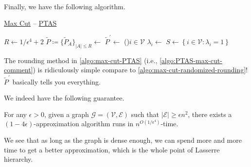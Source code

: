 Finally, we have the following algorithm.

\begin{algorithm}[H]\label{algo:max-cut-PTAS}
	\DontPrintSemicolon
	\caption{\hyperref[prb:max-cut]{Max Cut} -- \href{https://en.wikipedia.org/wiki/Polynomial-time_approximation_scheme}{PTAS}}
	\BlankLine
	\(R\gets 1 / \epsilon ^4 + 2\)\;
	\(\widetilde{P} \coloneqq \{ \widetilde{P} _A \}_{\left\vert A \right\vert \leq R} \gets\)\;
	\(\widetilde{P} ^\prime \gets\)
	\;
	\label{algo:PTAS-max-cut-comment}
	\For(){\(i\in \mathcal{V} \)}{
		\(\lambda _i\gets\)\;
	}
	\(S\gets \left\{ i\in \mathcal{V} \colon \lambda _i = 1 \right\} \)\;
	\;
\end{algorithm}

\begin{remark}
	The rounding method in \autoref{algo:max-cut-PTAS} (i.e., \autoref{algo:PTAS-max-cut-comment}) is ridiculously simple compare to \autoref{algo:max-cut-randomized-rounding}! \(\widetilde{P} ^\prime \) basically tells you everything.
\end{remark}

We indeed have the following guarantee.

\begin{theorem}\label{thm:PTAS-for-max-cut}
	For any \(\epsilon >0\), given a graph \(\mathcal{G} =(\mathcal{V} , \mathcal{E} )\) such that \(\left\vert \mathcal{E}  \right\vert \geq \epsilon n^{2} \), there exists a \((1 - 4\epsilon )\)-approximation algorithm runs in \(n^{O(1 / \epsilon ^4)}\)-time.
\end{theorem}

We see that as long as the graph is dense enough, we can spend more and more time to get a better approximation, which is the whole point of Lasserre hierarchy.